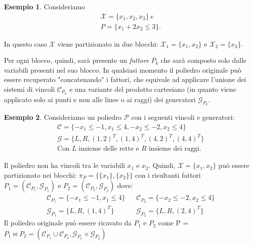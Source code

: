 \documentclass{mimosis}
\theoremstyle{definition}
\newtheorem{exmp}{Esempio}[section]
\begin{document}
\begin{exmp}
Consideriamo
\begin{align*}
  &\mathcal{X} = \{x_1, x_2, x_3\} ~{}e \\
  &P = \{x_1 + 2x_2 \le 3\}.
\end{align*}

In questo caso $\mathcal{X}$ viene partizionato in due blocchi: $\mathcal{X}_1 = \{x_1, x_2\}$ e
$\mathcal{X}_2 = \{x_3\}$.
\end{exmp}

Per ogni blocco, quindi, sarà presente un \emph{fattore} \(P_k\) che sarà composto solo
dalle variabili presenti nel suo blocco. In qualsiasi momento il poliedro
originale può essere recuperato "concatenando" i fattori, che equivale ad
applicare l'unione dei sistemi di vincoli
\(\mathcal{C}_{P_k}\) e una variante del prodotto cartesiano (in quanto viene
applicato solo ai punti e non alle linee o ai raggi) dei generatori \(\mathcal{G}_{P_k}\).

\begin{exmp}
  Consideriamo un poliedro $\mathcal{P}$ con i seguenti vincoli e generatori:
  \begin{align*}
    &\mathcal{C} = \{-x_{1} \le -1, x_{1} \le 4, -x_{2} \le -2, x_{2} \le 4\} \\
    &\mathcal{G} = \{\mathit{L}, \mathit{R}, (1,2)^T, (1,4)^T, (4,2)^T, (4,4)^T\} \\
    &\text{Con } \mathit{L} \text{ insieme delle rette e } \mathit{R} \text{ insieme dei raggi.}
  \end{align*}

  Il poliedro non ha vincoli tra le variabili $x_1$ e $x_2$. Quindi, $\mathcal{X} = \{x_1,x_2\}$
  può essere partizionato nei blocchi: $\pi_P = \{\{x_1\}, \{x_2\}\}$ con i risultanti fattori
  $P_1 = (\mathcal{C}_{P_1}, \mathcal{G}_{P_1})$ e $P_2 = (\mathcal{C}_{P_2}, \mathcal{G}_{P_2})$ dove:
  \begin{align*}
      &\mathcal{C}_{P_{1}} = \{-x_{1} \le -1, x_{1} \le 4\}  &&\mathcal{C}_{P_{2}} = \{ -x_{2} \le -2, x_{2} \le 4\} \\
      &\mathcal{G}_{P_{1}} = \{\mathit{L}, \mathit{R}, (1,4)^T\} &&\mathcal{G}_{P_{2}} = \{\mathit{L}, \mathit{R}, (2,4)^T\}
  \end{align*}
  Il poliedro originale può essere ricavato da $P_{1}$ e $P_{2}$ come
  P = $P_{1} \bowtie P_{2} = (\mathcal{C}_{P_{1}} \cup \mathcal{C}_{P_{2}}, \mathcal{G}_{P_{1}} \times \mathcal{G}_{P_{2}})$
\end{exmp}
\end{document}
